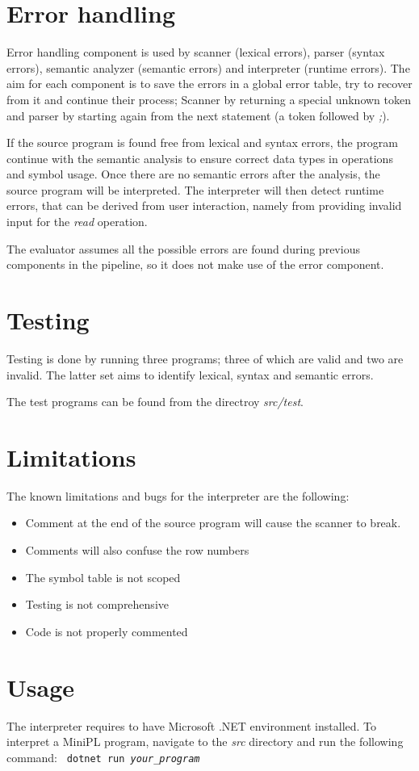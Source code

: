\documentclass[fleqn]{article}
\begin{document}
\newpage
\section{Error handling}
Error handling component is used by scanner (lexical errors), parser (syntax errors), semantic analyzer (semantic errors) and interpreter (runtime errors).
The aim for each component is to save the errors in a global error table, try to recover from it and continue their process;
Scanner by returning a special unknown token and parser by starting again from the next statement (a token followed by \textit{;}).
\par
If the source program is found free from lexical and syntax errors, the program continue with the semantic analysis to ensure correct data types in operations and symbol usage.
Once there are no semantic errors after the analysis, the source program will be interpreted.
The interpreter will then detect runtime errors, that can be derived from user interaction, namely from providing invalid input for the \textit{read} operation.
\par
The evaluator assumes all the possible errors are found during previous components in the pipeline, so it does not make use of the error component.

\section{Testing}
Testing is done by running three programs; three of which are valid and two are invalid. The latter set aims to identify lexical, syntax and semantic errors.
\par
The test programs can be found from the directroy \textit{src/test}.
\section{Limitations}
\par
The known limitations and bugs for the interpreter are the following:

\begin{itemize}
    \item Comment at the end of the source program will cause the scanner to break.
    \item Comments will also confuse the row numbers
    \item The symbol table is not scoped
    \item Testing is not comprehensive
    \item Code is not properly commented
\end{itemize}

\section{Usage}
The interpreter requires to have Microsoft .NET environment installed. To interpret a MiniPL program, navigate to the \textit{src} directory and run the following command:
\newline
\newline
\texttt{
    dotnet run \textit{your\_program}
}

\appendix

\appendix

\end{document}
